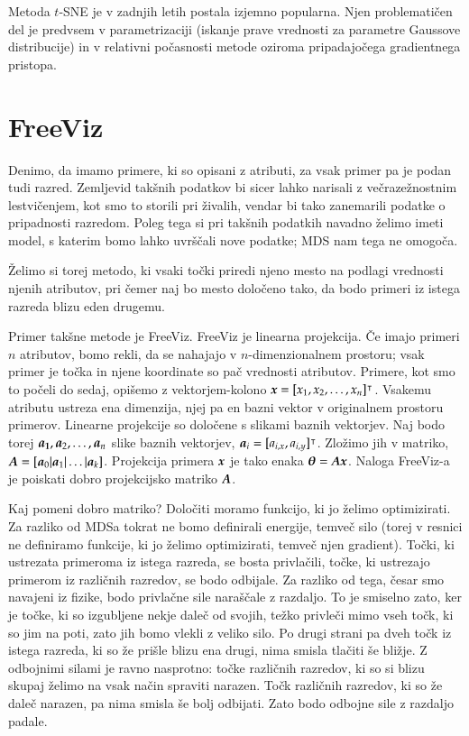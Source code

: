 Metoda $t$-SNE je v zadnjih letih postala izjemno popularna. Njen problematičen del je predvsem v parametrizaciji (iskanje prave vrednosti za parametre Gaussove distribucije) in v relativni počasnosti metode oziroma pripadajočega gradientnega pristopa.

\section{FreeViz}

Denimo, da imamo primere, ki so opisani z atributi, za vsak primer pa je podan tudi razred. Zemljevid takšnih podatkov bi sicer lahko narisali z večrazežnostnim lestvičenjem, kot smo to storili pri živalih, vendar bi tako zanemarili podatke o pripadnosti razredom. Poleg tega si pri takšnih podatkih navadno želimo imeti model, s katerim bomo lahko uvrščali nove podatke; MDS nam tega ne omogoča.

Želimo si torej metodo, ki vsaki točki priredi njeno mesto na podlagi vrednosti njenih atributov, pri čemer naj bo mesto določeno tako, da bodo primeri iz istega razreda blizu eden drugemu.

Primer takšne metode je FreeViz. FreeViz je linearna projekcija. Če imajo primeri $n$ atributov, bomo rekli, da se nahajajo v $n$-dimenzionalnem prostoru; vsak primer je točka in njene koordinate so pač vrednosti atributov. Primere, kot smo to počeli do sedaj, opišemo z vektorjem-kolono $\boldsymbol{x} = [x_1, x_2, \ldots, x_n]^\intercal$. Vsakemu atributu ustreza ena dimenzija, njej pa en bazni vektor v originalnem prostoru primerov. Linearne projekcije so določene s slikami baznih vektorjev. Naj bodo torej $\boldsymbol{a_1}, \boldsymbol{a}_2, \ldots, \boldsymbol{a}_n$ slike baznih vektorjev, $\boldsymbol{a}_i = [a_{i,x}, a_{i,y}]^\intercal$. Zložimo  jih v matriko, $\boldsymbol{A} = [\boldsymbol{a}_0 | \boldsymbol{a}_1 | \ldots | \boldsymbol{a}_k]$. Projekcija primera $\boldsymbol{x}$ je tako enaka $\boldsymbol{\theta} = \boldsymbol{A}\boldsymbol{x}$. Naloga FreeViz-a je poiskati dobro projekcijsko matriko $\boldsymbol{A}$.

Kaj pomeni dobro matriko? Določiti moramo funkcijo, ki jo želimo optimizirati. Za razliko od MDSa tokrat ne bomo definirali energije, temveč silo (torej v resnici ne definiramo funkcije, ki jo želimo optimizirati, temveč njen gradient). Točki, ki ustrezata primeroma iz istega razreda, se bosta privlačili, točke, ki ustrezajo primerom iz različnih razredov, se bodo odbijale. Za razliko od tega, česar smo navajeni iz fizike, bodo privlačne sile naraščale z razdaljo. To je smiselno zato, ker je točke, ki so izgubljene nekje daleč od svojih, težko privleči mimo vseh točk, ki so jim na poti, zato jih bomo vlekli z veliko silo. Po drugi strani pa dveh točk iz istega razreda, ki so že prišle blizu ena drugi, nima smisla tlačiti še bližje. Z odbojnimi silami je ravno nasprotno: točke različnih razredov, ki so si blizu skupaj želimo na vsak način spraviti narazen. Točk različnih razredov, ki so že daleč narazen, pa nima smisla še bolj odbijati. Zato bodo odbojne sile z razdaljo padale.

